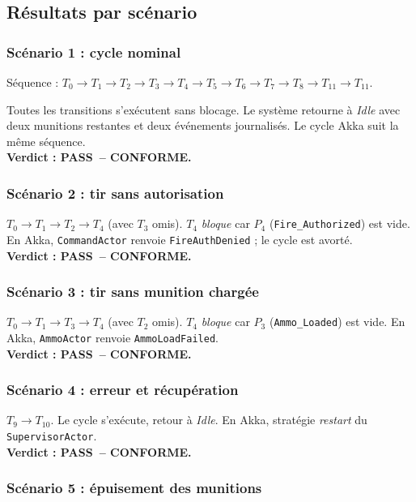 \documentclass[11pt,a4paper]{article}
\newcommand{\code}[1]{\texttt{#1}}
\newcommand{\PASS}{\textcolor{green!50!black}{\textbf{PASS}}}
\begin{document}
\subsection{Résultats par scénario}

\subsubsection{Scénario 1 : cycle nominal}

Séquence : $T_0 \to T_1 \to T_2 \to T_3 \to T_4 \to T_5 \to T_6 \to T_7 \to
T_8 \to T_{11} \to T_{11}$.

\noindent
Toutes les transitions s'exécutent sans blocage. Le système retourne à
\textit{Idle} avec deux munitions restantes et deux événements journalisés.
Le cycle Akka suit la même séquence.\\
\textbf{Verdict : \PASS\ -- CONFORME.}

\subsubsection{Scénario 2 : tir sans autorisation}

$T_0 \to T_1 \to T_2 \to T_4$ (avec $T_3$ omis). $T_4$ \emph{bloque} car
$P_4$ (\code{Fire\_Authorized}) est vide. En Akka, \code{CommandActor}
renvoie \code{FireAuthDenied} ; le cycle est avorté.\\
\textbf{Verdict : \PASS\ -- CONFORME.}

\subsubsection{Scénario 3 : tir sans munition chargée}

$T_0 \to T_1 \to T_3 \to T_4$ (avec $T_2$ omis). $T_4$ \emph{bloque} car
$P_3$ (\code{Ammo\_Loaded}) est vide. En Akka, \code{AmmoActor} renvoie
\code{AmmoLoadFailed}.\\
\textbf{Verdict : \PASS\ -- CONFORME.}

\subsubsection{Scénario 4 : erreur et récupération}

$T_9 \to T_{10}$. Le cycle s'exécute, retour à \textit{Idle}. En Akka,
stratégie \emph{restart} du \code{SupervisorActor}.\\
\textbf{Verdict : \PASS\ -- CONFORME.}

\subsubsection{Scénario 5 : épuisement des munitions}
\end{document}
